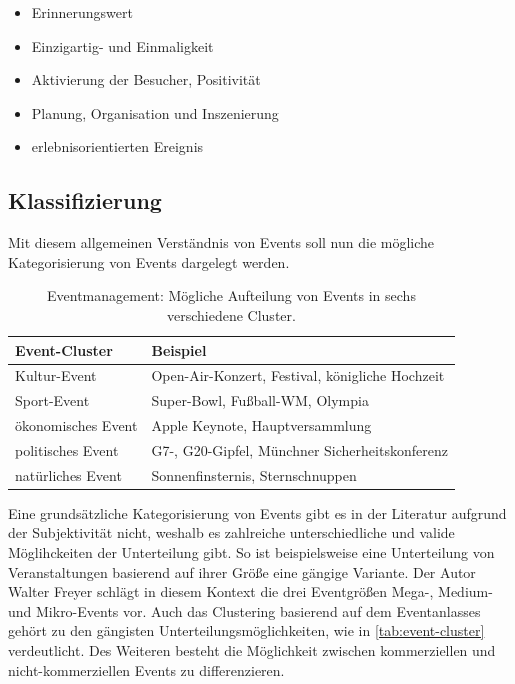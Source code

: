 \begin{itemize}
    \item Erinnerungswert
    \item Einzigartig- und Einmaligkeit
    \item Aktivierung der Besucher, Positivität
    \item Planung, Organisation und Inszenierung
    \item erlebnisorientierten Ereignis
\end{itemize}

\subsection{Klassifizierung}
Mit diesem allgemeinen Verständnis von Events soll nun die mögliche Kategorisierung von Events dargelegt werden. 

\begin{table}[!h]
    \centering
    \begin{tabular}{l|l}
        \textbf{Event-Cluster}      & \textbf{Beispiel} \\ \hline
        Kultur-Event                & Open-Air-Konzert, Festival, königliche Hochzeit        \\ \hline
        Sport-Event                 & Super-Bowl, Fußball-WM, Olympia   \\ \hline
        ökonomisches Event          & Apple Keynote, Hauptversammlung   \\ \hline
        politisches Event           & G7-, G20-Gipfel, Münchner Sicherheitskonferenz                   \\ \hline
        natürliches Event           & Sonnenfinsternis, Sternschnuppen        
    \end{tabular}%
    \caption{Eventmanagement: Mögliche Aufteilung von Events in sechs verschiedene Cluster.}
    \label{tab:event-cluster}
\end{table}

Eine grundsätzliche Kategorisierung von Events gibt es in der Literatur aufgrund der Subjektivität nicht, weshalb es zahlreiche unterschiedliche und valide Möglihckeiten der Unterteilung gibt.
So ist beispielsweise eine Unterteilung von Veranstaltungen basierend auf ihrer Größe eine gängige Variante.
Der Autor Walter Freyer schlägt in diesem Kontext die drei Eventgrößen Mega-, Medium- und Mikro-Events vor.
Auch das Clustering basierend auf dem Eventanlasses gehört zu den gängisten Unterteilungsmöglichkeiten, wie in \autoref{tab:event-cluster} verdeutlicht.
Des Weiteren besteht die Möglichkeit zwischen kommerziellen und nicht-kommerziellen Events zu differenzieren.\autocite[Vgl.][S. 23 ff.]{Eisermann.2014} 

